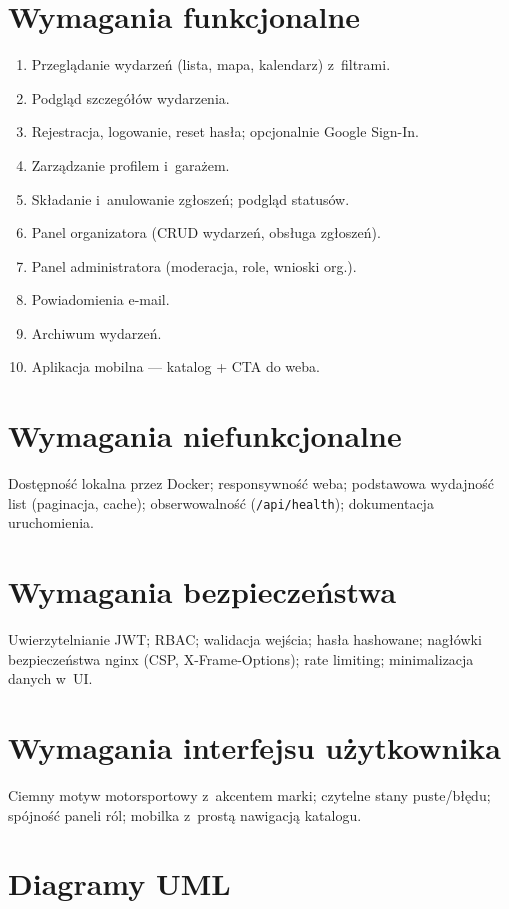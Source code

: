 \documentclass{sprz}
\begin{document}
\section{Wymagania funkcjonalne}
\begin{enumerate}
  \item Przeglądanie wydarzeń (lista, mapa, kalendarz) z~filtrami.
  \item Podgląd szczegółów wydarzenia.
  \item Rejestracja, logowanie, reset hasła; opcjonalnie Google Sign-In.
  \item Zarządzanie profilem i~garażem.
  \item Składanie i~anulowanie zgłoszeń; podgląd statusów.
  \item Panel organizatora (CRUD wydarzeń, obsługa zgłoszeń).
  \item Panel administratora (moderacja, role, wnioski org.).
  \item Powiadomienia e-mail.
  \item Archiwum wydarzeń.
  \item Aplikacja mobilna --- katalog + CTA do weba.
\end{enumerate}

\section{Wymagania niefunkcjonalne}
Dostępność lokalna przez Docker; responsywność weba; podstawowa wydajność list (paginacja, cache); obserwowalność (\texttt{/api/health}); dokumentacja uruchomienia.

\section{Wymagania bezpieczeństwa}
Uwierzytelnianie JWT; RBAC; walidacja wejścia; hasła hashowane; nagłówki bezpieczeństwa nginx (CSP, X-Frame-Options); rate limiting; minimalizacja danych w~UI.

\section{Wymagania interfejsu użytkownika}
Ciemny motyw motorsportowy z~akcentem marki; czytelne stany puste/błędu; spójność paneli ról; mobilka z~prostą nawigacją katalogu.

\section{Diagramy UML}
\end{document}
